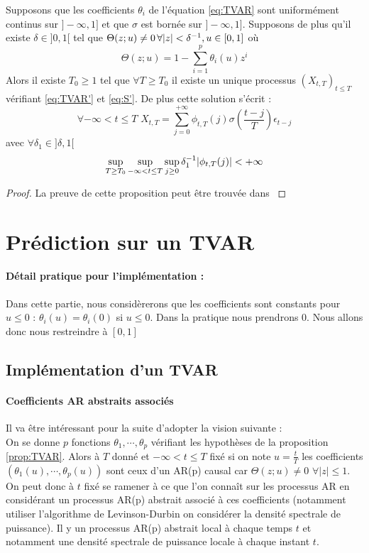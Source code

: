 \documentclass{report}
\begin{document}
\begin{Prop}\label{prop:TVAR}
Supposons que les coefficients $\theta_i$ de l'équation \eqref{eq:TVAR} sont uniformément continus sur $]-\infty,1]$ et que $\sigma$ est bornée sur $]-\infty,1]$. Supposons de plus qu'il existe $\delta \in ]0,1[$ tel que $\Theta(z;u)\neq 0 \, \forall { \left| z \right|} < \delta^{-1}, u\in [0,1]$ où 
\[
\Theta(z;u) = 1 - \sum_{i=1}^p \theta_i(u) z^i
\]
Alors il existe $T_0 \geq 1$ tel que $\forall T \geq T_0$ il existe un unique processus $(X_{t,T})_{t\leq T}$ vérifiant \eqref{eq:TVAR'} et \eqref{eq:S'}. De plus cette solution s'écrit : 
\begin{equation}\label{eq:repr_lineaire}
\forall -\infty < t \leq T
 \,\, X_{t,T} = \sum_{j=0}^{+\infty} \phi_{t,T} (j) \sigma\left( \frac{t-j}{T} \right) \epsilon_{t-j}
\end{equation}
avec $\forall \delta_1 \in ]\delta, 1[$
$$
\sup_{T \geq T_0} \sup_{-\infty < t \leq T} \sup_{j\geq 0} \delta_1^{-1} { \left| \phi_{t,T}(j) \right|} < +\infty
$$

\end{Prop}
\begin{proof}
La preuve de cette proposition peut être trouvée dans \citep{giraud-roueff-sanchez-aos2015}
\end{proof}
\section{Prédiction sur un TVAR}
\paragraph{Détail pratique pour l'implémentation :} Dans cette partie, nous considèrerons que les coefficients sont constants pour $u \leq 0$ : $\theta_i(u) = \theta_i(0)$ si $u \leq 0$. Dans la pratique nous prendrons $0$. Nous allons donc nous restreindre à $[0,1]$
\subsection{Implémentation d'un TVAR}
\paragraph{Coefficients AR abstraits associés}
Il va être intéressant pour la suite d'adopter la vision suivante : \\
On se donne $p$ fonctions $\theta_1, \cdots, \theta_p$ vérifiant les hypothèses de la proposition \ref{prop:TVAR}. Alors à $T$ donné et $-\infty < t \leq T$ fixé si on note $u = \frac{t}{T}$ les coefficients $(\theta_1(u), \cdots , \theta_p(u))$ sont ceux d'un AR(p) causal car $\Theta(z;u) \neq 0 \,\, \forall |z| \leq 1$.\\
On peut donc à $t$ fixé se ramener à ce que l'on connaît sur les processus AR en considérant un processus AR(p) abstrait associé à ces coefficients (notamment utiliser l'algorithme de Levinson-Durbin on considérer la densité spectrale de puissance). Il y un processus AR(p) abstrait local à chaque temps $t$ et notamment une densité spectrale de puissance locale à chaque instant $t$. \\
\end{document}
